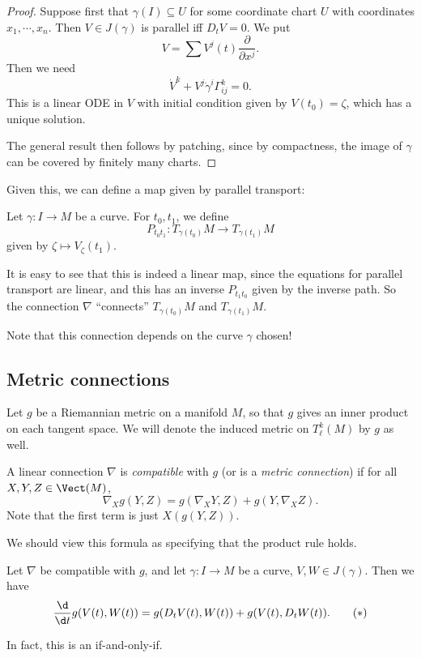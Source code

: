 \documentclass[a4paper]{article}
\begin{document}
\begin{proof}
  Suppose first that $\gamma(I) \subseteq U$ for some coordinate chart $U$ with coordinates $x_1, \cdots, x_n$. Then $V\in J(\gamma)$ is parallel iff $D_t V = 0$. We put
  \[
    V = \sum V^j(t) \frac{\partial}{\partial x^j}.
  \]
  Then we need
  \[
    \dot{V}^k + V^j \dot\gamma^i \Gamma_{ij}^k = 0.
  \]
  This is a linear ODE in $V$ with initial condition given by $V(t_0) = \zeta$, which has a unique solution.

  The general result then follows by patching, since by compactness, the image of $\gamma$ can be covered by finitely many charts.
\end{proof}

Given this, we can define a map given by parallel transport:
\begin{defi}
  Let $\gamma: I \to M$ be a curve. For $t_0, t_1$, we define
  \[
    P_{t_0 t_1}: T_{\gamma(t_0)}M \to T_{\gamma(t_1)}M
  \]
  given by $\zeta \mapsto V_{\zeta}(t_1)$.
\end{defi}

It is easy to see that this is indeed a linear map, since the equations for parallel transport are linear, and this has an inverse $P_{t_1t_0}$ given by the inverse path. So the connection $\nabla$ ``connects'' $T_{\gamma(t_0)}M$ and $T_{\gamma(t_1)}M$.

Note that this connection depends on the curve $\gamma$ chosen!

\subsection{Metric connections}
Let $g$ be a Riemannian metric on a manifold $M$, so that $g$ gives an inner product on each tangent space. We will denote the induced metric on $T^k_\ell(M)$ by $g$ as well.
\begin{defi}
  A linear connection $\nabla$ is \emph{compatible} with $g$ (or is a \emph{metric connection}) if for all $X, Y, Z \in \Vect(M)$,
  \[
    \nabla_X g(Y, Z) = g(\nabla_X Y, Z) + g(Y, \nabla_X Z).
  \]
  Note that the first term is just $X(g(Y, Z))$.
\end{defi}
We should view this formula as specifying that the product rule holds.

\begin{lemma}
  Let $\nabla$ be compatible with $g$, and let $\gamma: I \to M$ be a curve, $V, W \in J(\gamma)$. Then we have
  \[
    \frac{\d}{\d t}g(V(t), W(t)) = g(D_t V(t), W(t)) + g(V(t), D_t W(t)).\tag{$*$}
  \]
\end{lemma}
In fact, this is an if-and-only-if.
\end{document}
